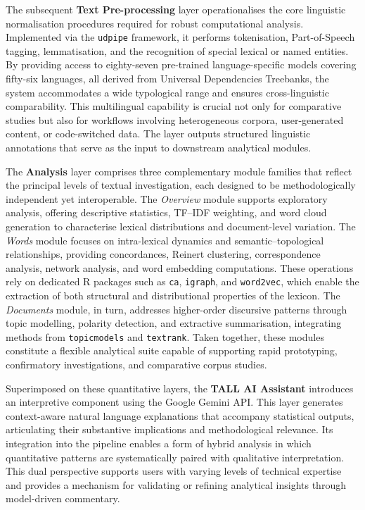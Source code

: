 \documentclass[8pt,a4paper]{article}
\begin{document}
The subsequent \textbf{Text Pre-processing} layer operationalises the core linguistic normalisation procedures required for robust computational analysis. Implemented via the \texttt{udpipe} framework, it performs tokenisation, Part-of-Speech tagging, lemmatisation, and the recognition of special lexical or named entities. By providing access to eighty-seven pre-trained language-specific models covering fifty-six languages, all derived from Universal Dependencies Treebanks, the system accommodates a wide typological range and ensures cross-linguistic comparability. This multilingual capability is crucial not only for comparative studies but also for workflows involving heterogeneous corpora, user-generated content, or code-switched data. The layer outputs structured linguistic annotations that serve as the input to downstream analytical modules.

The \textbf{Analysis} layer comprises three complementary module families that reflect the principal levels of textual investigation, each designed to be methodologically independent yet interoperable. The \textit{Overview} module supports exploratory analysis, offering descriptive statistics, TF--IDF weighting, and word cloud generation to characterise lexical distributions and document-level variation. The \textit{Words} module focuses on intra-lexical dynamics and semantic--topological relationships, providing concordances, Reinert clustering, correspondence analysis, network analysis, and word embedding computations. These operations rely on dedicated R packages such as \texttt{ca}, \texttt{igraph}, and \texttt{word2vec}, which enable the extraction of both structural and distributional properties of the lexicon. The \textit{Documents} module, in turn, addresses higher-order discursive patterns through topic modelling, polarity detection, and extractive summarisation, integrating methods from \texttt{topicmodels} and \texttt{textrank}. Taken together, these modules constitute a flexible analytical suite capable of supporting rapid prototyping, confirmatory investigations, and comparative corpus studies.

Superimposed on these quantitative layers, the \textbf{TALL AI Assistant} introduces an interpretive component using the Google Gemini API. This layer generates context-aware natural language explanations that accompany statistical outputs, articulating their substantive implications and methodological relevance. Its integration into the pipeline enables a form of hybrid analysis in which quantitative patterns are systematically paired with qualitative interpretation. This dual perspective supports users with varying levels of technical expertise and provides a mechanism for validating or refining analytical insights through model-driven commentary.
\end{document}
